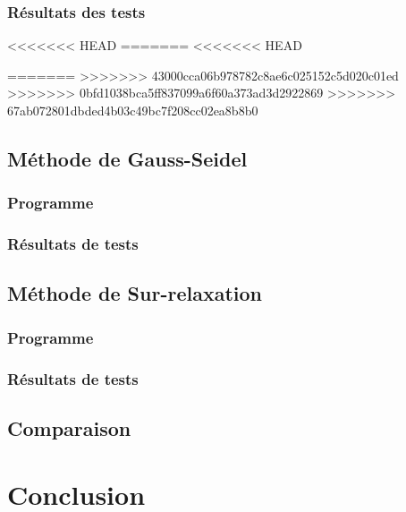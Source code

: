 \documentclass{report}
\begin{document}
      \subsection{Résultats des tests}
<<<<<<< HEAD
=======
<<<<<<< HEAD
        
=======
>>>>>>> 43000cca06b978782c8ae6c025152c5d020c01ed
>>>>>>> 0bfd1038bca5ff837099a6f60a373ad3d2922869
>>>>>>> 67ab072801dbded4b03c49bc7f208cc02ea8b8b0
  	\newpage
  	\section{Méthode de Gauss-Seidel}
  	  \subsection{Programme}
        
      \newpage
      \subsection{Résultats de tests}
  	\newpage
  	\section{Méthode de Sur-relaxation}
  	  \subsection{Programme}
        
      \newpage
      \subsection{Résultats de tests}
     \newpage
     \section{Comparaison}
  \chapter*{Conclusion}
  
\end{document}
